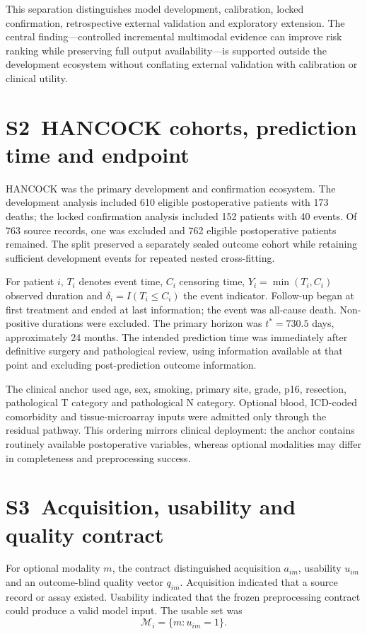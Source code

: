 \documentclass[pdflatex,sn-nature]{sn-jnl}
\begin{document}
This separation distinguishes model development, calibration, locked confirmation, retrospective external validation and exploratory extension. The central finding---controlled incremental multimodal evidence can improve risk ranking while preserving full output availability---is supported outside the development ecosystem without conflating external validation with calibration or clinical utility.

\section*{S2~HANCOCK cohorts, prediction time and endpoint}
HANCOCK was the primary development and confirmation ecosystem. The development analysis included 610 eligible postoperative patients with 173 deaths; the locked confirmation analysis included 152 patients with 40 events. Of 763 source records, one was excluded and 762 eligible postoperative patients remained. The split preserved a separately sealed outcome cohort while retaining sufficient development events for repeated nested cross-fitting.

For patient $i$, $T_i$ denotes event time, $C_i$ censoring time, $Y_i=\min(T_i,C_i)$ observed duration and $\delta_i=I(T_i\le C_i)$ the event indicator. Follow-up began at first treatment and ended at last information; the event was all-cause death. Non-positive durations were excluded. The primary horizon was $t^*=730.5$ days, approximately 24 months. The intended prediction time was immediately after definitive surgery and pathological review, using information available at that point and excluding post-prediction outcome information.

The clinical anchor used age, sex, smoking, primary site, grade, p16, resection, pathological T category and pathological N category. Optional blood, ICD-coded comorbidity and tissue-microarray inputs were admitted only through the residual pathway. This ordering mirrors clinical deployment: the anchor contains routinely available postoperative variables, whereas optional modalities may differ in completeness and preprocessing success.

\section*{S3~Acquisition, usability and quality contract}
For optional modality $m$, the contract distinguished acquisition $a_{im}$, usability $u_{im}$ and an outcome-blind quality vector $q_{im}$. Acquisition indicated that a source record or assay existed. Usability indicated that the frozen preprocessing contract could produce a valid model input. The usable set was
\begin{equation}
\mathcal{M}_i=\{m:u_{im}=1\}.
\end{equation}
\end{document}
